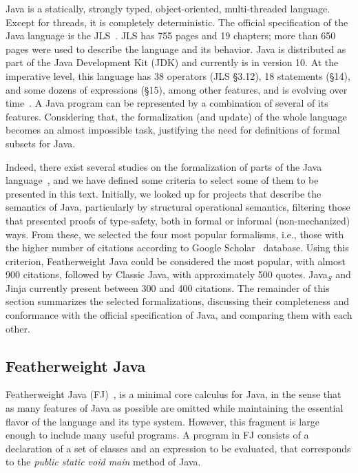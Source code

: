 \documentclass[tese,capa,english]{texufpel}
\begin{document}
Java is a statically, strongly typed, object-oriented, multi-threaded language. Except for threads, it is completely deterministic. The official specification of the Java language is the JLS~\cite{oracle2018}. JLS has 755 pages and 19 chapters; more than 650 pages were used to describe the language and its behavior. Java is distributed as part of the Java Development Kit (JDK) and currently is in version 10. At the imperative level, this language has 38 operators (JLS \S 3.12), 18 statements (\S 14), and some dozens of expressions (\S 15), among other features, and is evolving over time~\cite{Bogdanas:2015:KCS:2775051.2676982}. A Java program can be represented by a combination of several of its features. Considering that, the formalization (and update) of the whole language becomes an almost impossible task, justifying the need for definitions of formal subsets for Java.

Indeed, there exist several studies on the formalization of parts of the Java language~\cite{Flatt:1998:CM:268946.268961,Drossopoulou:1999:DSJ:645580.658817,Igarashi:2001:FJM:503502.503505,Klein:2006:MMJ:1146809.1146811,Bogdanas:2015:KCS:2775051.2676982,Farzan04formalanalysis,Stark:2001:JJV:559207}, and we have defined some criteria to select some of them to be presented in this text. Initially, we looked up for projects that describe the semantics of Java, particularly by structural operational semantics, filtering those that presented proofs of type-safety, both in formal or informal (non-mechanized) ways. From these, we selected the four most popular formalisms, i.e., those with the higher number of citations according to Google Scholar~\cite{scholar2018} database. Using this criterion, Featherweight Java could be considered the most popular, with almost 900 citations, followed by Classic Java, with approximately 500 quotes. Java$_S$ and Jinja currently present between 300 and 400 citations. The remainder of this section summarizes the selected formalizations, discussing their completeness and conformance with the official specification of Java, and comparing them with each other.

\subsection{Featherweight Java}

Featherweight Java (FJ)~\cite{Igarashi:2001:FJM:503502.503505}, is a minimal core calculus for Java, in the sense that as many features of Java as possible are omitted while maintaining the essential flavor of the language and its type system. However, this fragment is large enough to include many useful programs. A program in FJ consists of a declaration of a set of classes and an expression to be evaluated, that corresponds to the \emph{public static void main} method of Java. 
\end{document}
